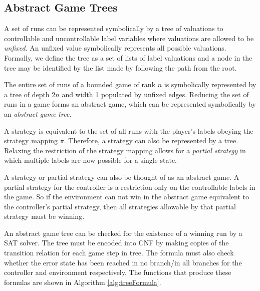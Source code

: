 \documentclass{llncs}
\begin{document}
\subsection{Abstract Game Trees}

A set of runs can be represented symbolically by a tree of valuations to
controllable and uncontrollable label variables where valuations are allowed to
be \emph{unfixed}. An unfixed value symbolically represents all possible
valuations. Formally, we define the tree as a set of lists of label valuations
and a node in the tree may be identified by the list made by following the path
from the root.

The entire set of runs of a bounded game of rank $n$ is
symbolically represented by a tree of depth $2n$ and width 1 populated by
unfixed edges.  Reducing the set of runs in a game forms an abstract game,
which can be represented symbolically by an \emph{abstract game tree}.

A strategy is equivalent to the set of all runs with the player's labels
obeying the strategy mapping $\pi$. Therefore, a strategy can also be
represented by a tree. Relaxing the restriction of the strategy mapping allows
for a \emph{partial strategy} in which multiple labels are now possible for a
single state.

A strategy or partial strategy can also be thought of as an abstract game. A
partial strategy for the controller is a restriction only on the controllable
labels in the game. So if the environment can not win in the abstract game
equivalent to the controller's partial strategy, then all strategies allowable
by that partial strategy must be winning.

An abstract game tree can be checked for the existence of a winning run by a
SAT solver\cite{narodytska2014}.  The tree must be encoded into CNF by making
copies of the transition relation for each game step in tree. The formula must
also check whether the error state has been reached in no branch/in all
branches for the controller and environment respectively. The functions that
produce these formulas are shown in Algorithm \ref{alg:treeFormula}.
\end{document}
